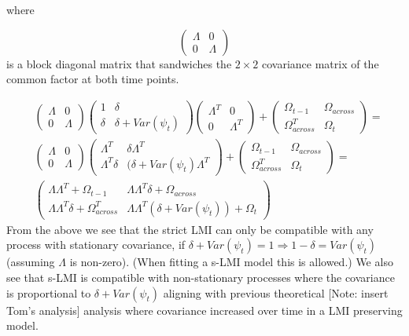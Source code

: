 \documentclass[
  letterpaper,
  DIV=11,
  numbers=noendperiod]{scrartcl}
\begin{document}
where

\[\begin{pmatrix}    \Lambda & 0\\   0 & \Lambda \end{pmatrix}\] is a
block diagonal matrix that sandwiches the \(2\times2\) covariance matrix
of the common factor at both time points.

\[
\begin{align*}&\begin{pmatrix}    \Lambda & 0\\   0 & \Lambda \end{pmatrix} \begin{pmatrix}   1 & \delta \\   \delta & \delta+Var(\psi_t) \end{pmatrix} \begin{pmatrix}    \Lambda^T & 0\\   0 & \Lambda^T \end{pmatrix}+ \begin{pmatrix}   \Omega_{t-1} & \Omega_{across} \\   \Omega_{across}^T & \Omega_t \end{pmatrix} =\\
&\begin{pmatrix}    \Lambda & 0\\   0 & \Lambda \end{pmatrix} \begin{pmatrix}    \Lambda^T & \delta\Lambda^T\\   \Lambda^T\delta & (\delta+Var(\psi_t)\Lambda^T \end{pmatrix} + 
\begin{pmatrix}   
\Omega_{t-1} & \Omega_{across} \\   
\Omega_{across}^T & \Omega_t \end{pmatrix}=\\
& \begin{pmatrix}    
\Lambda\Lambda^T + \Omega_{t-1}& \Lambda\Lambda^T\delta + \Omega_{across}\\   
\Lambda\Lambda^T\delta + \Omega_{across}^T & \Lambda\Lambda^T(\delta+Var(\psi_t)) + \Omega_t 
\end{pmatrix} 
\end{align*}
\] From the above we see that the strict LMI can only be compatible with
any process with stationary covariance, if
\(\delta+Var(\psi_t)=1\Rightarrow1-\delta=Var(\psi_t)\) (assuming
\(\Lambda\) is non-zero). (When fitting a s-LMI model this is allowed.)
We also see that s-LMI is compatible with non-stationary processes where
the covariance is proportional to \(\delta+Var(\psi_t)\) aligning with
previous theoretical {[}Note: insert Tom's analysis{]} analysis where
covariance increased over time in a LMI preserving model.
\end{document}
